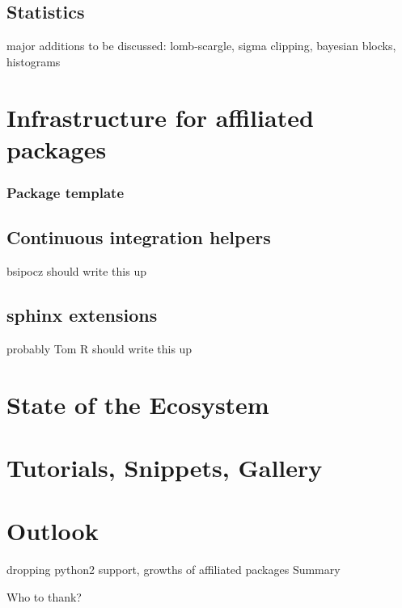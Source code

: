 \documentclass[modern]{aastex61}
\begin{document}
\subsection{Statistics}


major additions to be discussed: lomb-scargle, sigma clipping, bayesian blocks, histograms

\section{Infrastructure for affiliated packages}
\subsubsection{Package template}

\subsection{Continuous integration helpers}
bsipocz should write this up
\subsection{sphinx extensions}
probably Tom R should write this up
\section{State of the Ecosystem}

\section{Tutorials, Snippets, Gallery}

\section{Outlook}
dropping python2 support, growths of affiliated packages
Summary

\acknowledgments

Who to thank?


          
          


\begin{thebibliography}{}

\end{thebibliography}
\end{document}
